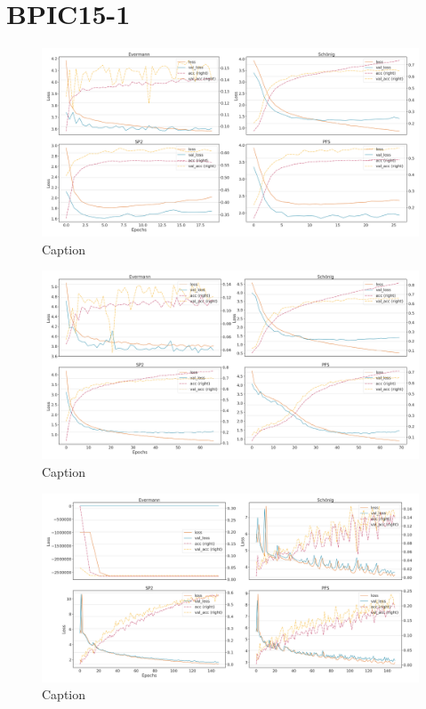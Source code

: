 \section{BPIC15-1}
\begin{figure}[!htb]
    \centering
    \includegraphics[width=\textwidth]{gfx/bpic2015_1/individual_loss_acc_curve.png}
    \caption{Caption}
    \label{fig:my_label}
\end{figure}
\begin{figure}[!htb]
    \centering
    \includegraphics[width=\textwidth]{gfx/bpic2015_1/grouped_loss_acc_curve.png}
    \caption{Caption}
    \label{fig:my_label}
\end{figure}
\begin{figure}[!htb]
    \centering
    \includegraphics[width=\textwidth]{gfx/bpic2015_1/padded_loss_acc_curve.png}
    \caption{Caption}
    \label{fig:my_label}
\end{figure}

